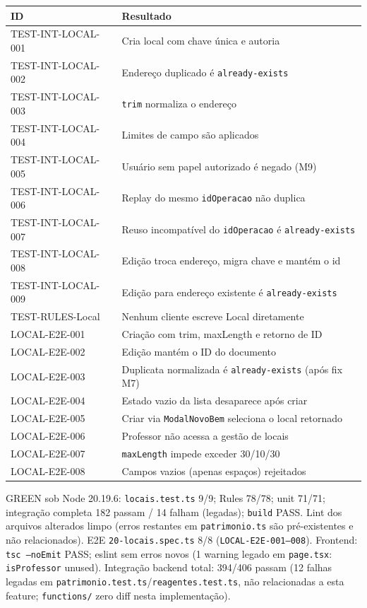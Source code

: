 \small
\begin{longtable}{@{}p{}p{}@{}}
\toprule
ID & Resultado \\
\midrule
\endhead
TEST-INT-LOCAL-001 & Cria local com chave única e autoria \\
TEST-INT-LOCAL-002 & Endereço duplicado é \texttt{already-exists} \\
TEST-INT-LOCAL-003 & \texttt{trim} normaliza o endereço \\
TEST-INT-LOCAL-004 & Limites de campo são aplicados \\
TEST-INT-LOCAL-005 & Usuário sem papel autorizado é negado (M9) \\
TEST-INT-LOCAL-006 & Replay do mesmo \texttt{idOperacao} não duplica \\
TEST-INT-LOCAL-007 & Reuso incompatível do \texttt{idOperacao} é \texttt{already-exists} \\
TEST-INT-LOCAL-008 & Edição troca endereço, migra chave e mantém o id \\
TEST-INT-LOCAL-009 & Edição para endereço existente é \texttt{already-exists} \\
TEST-RULES-Local & Nenhum cliente escreve Local diretamente \\
LOCAL-E2E-001 & Criação com trim, maxLength e retorno de ID \\
LOCAL-E2E-002 & Edição mantém o ID do documento \\
LOCAL-E2E-003 & Duplicata normalizada é \texttt{already-exists} (após fix M7) \\
LOCAL-E2E-004 & Estado vazio da lista desaparece após criar \\
LOCAL-E2E-005 & Criar via \texttt{ModalNovoBem} seleciona o local retornado \\
LOCAL-E2E-006 & Professor não acessa a gestão de locais \\
LOCAL-E2E-007 & \texttt{maxLength} impede exceder 30/10/30 \\
LOCAL-E2E-008 & Campos vazios (apenas espaços) rejeitados \\
\bottomrule
\end{longtable}
\normalsize

GREEN sob Node 20.19.6: \texttt{locais.test.ts} 9/9; Rules 78/78; unit 71/71;
integração completa 182 passam / 14 falham (legadas); \texttt{build} PASS. Lint
dos arquivos alterados limpo (erros restantes em \texttt{patrimonio.ts} são
pré-existentes e não relacionados). E2E \texttt{20-locais.spec.ts} 8/8
(\texttt{LOCAL-E2E-001–008}). Frontend: \texttt{tsc --noEmit} PASS; eslint sem
erros novos (1 warning legado em \texttt{page.tsx}: \texttt{isProfessor} unused).
Integração backend total: 394/406 passam (12 falhas legadas em
\texttt{patrimonio.test.ts}/\texttt{reagentes.test.ts}, não relacionadas a esta
feature; \texttt{functions/} zero diff nesta implementação).

